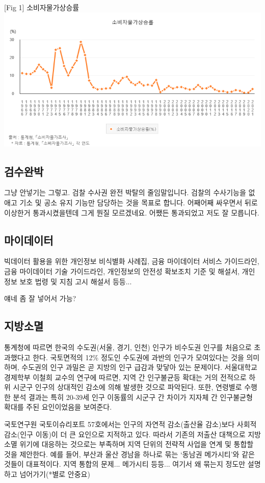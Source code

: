 \documentclass[preprint]{revtex4-2}
\begin{document}
[Fig 1] 소비자물가상승률\\
\includegraphics[width=\textwidth]{images/price.png} \\

\subsection{검수완박}
그냥 안넣기는 그렇고. 검찰 수사권 완전 박탈의 줄임말입니다. 검찰의 수사기능을 없애고 기소 및 공소 유지 기능만 담당하는 것을 목표로 합니다. 어째어째 싸우면서 뒤로 이상한거 통과시켰을텐데 그게 뭔질 모르겠네요. 어쨌든 통과되었고 저도 잘 모릅니다.

\subsection{마이데이터}
빅데이터 활용을 위한 개인정보 비식별화 사례집, 금융 마이데이터 서비스 가이드라인, 금융 마이데이터 기술 가이드라인, 개인정보의 안전성 확보조치 기준 및 해설서, 개인정보 보호 법령 및 지침 고시 해설서 등등...

얘네 좀 잘 넣어서 가능?

\subsection{지방소멸}
통계청에 따르면 한국의 수도권(서울, 경기, 인천) 인구가 비수도권 인구를 처음으로 초과했다고 한다. 국토면적의 12\% 정도인 수도권에 과반의 인구가 모여있다는 것을 의미하며, 수도권의 인구 과밀은 곧 지방의 인구 급감과 맞닿아 있는 문제이다. 서울대학교 경제학부 이철희 교수의 연구에 따르면, 지역 간 인구불균등 확대는 거의 전적으로 하위 시군구 인구의 상대적인 감소에 의해 발생한 것으로 파악된다. 또한, 연령별로 수행한 분석 결과는 특히 20-39세 인구 이동률의 시군구 간 차이가 지자체 간 인구불균형 확대를 주된 요인이었음을 보여준다.

국토연구원 국토이슈리포트 57호에서는 인구의 자연적 감소(출산율 감소)보다 사회적 감소(인구 이동)이 더 큰 요인으로 지적하고 있다. 따라서 기존의 저출산 대책으로 지방소멸 위기에 대응하는 것으로는 부족하며 지역 단위의 전략적 사업을 연계 및 통합할 것을 제안한다. 예를 들어, 부산과 울산 경남을 하나로 묶는 `동남권 메가시티'와 같은 것들이 대표적이다. 지역 통합의 문제... 메가시티 등등... 여기서 왜 묶는지 정도만 설명하고 넘어가기(*별로 안중요)
\end{document}
